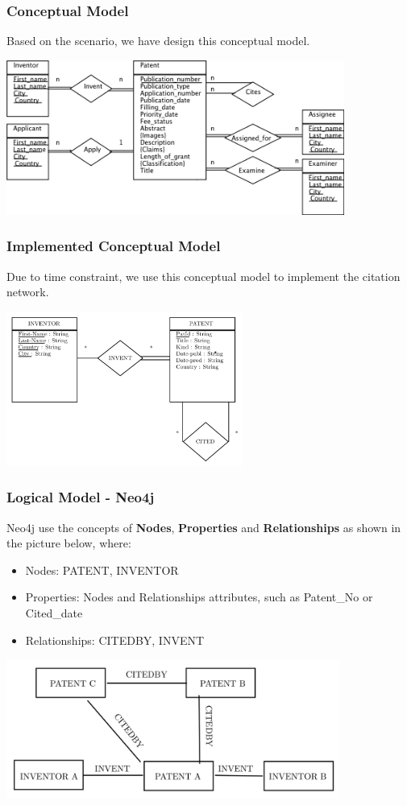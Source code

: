\documentclass{beamer}
\begin{document}
\begin{frame}
\frametitle{Conceptual Model}
Based on the scenario, we have design this conceptual model.
\begin{center}
\includegraphics[height=2in]{full_er.png}
\end{center}
\end{frame}

\begin{frame}
\frametitle{Implemented Conceptual Model}
Due to time constraint, we use this conceptual model to implement the citation network.
\begin{center}
\includegraphics[height=2in]{implemented_er.png}
\end{center}
\end{frame}

\begin{frame}
\frametitle{Logical Model - Neo4j}
Neo4j use the concepts of \textbf{Nodes}, \textbf{Properties} and \textbf{Relationships} as shown in the picture below, where:
\begin{itemize}
\item Nodes: PATENT, INVENTOR
\item Properties: Nodes and Relationships attributes, such as Patent\_No or Cited\_date
\item Relationships: CITEDBY, INVENT
\end{itemize}
\begin{center}
\includegraphics[height=1.8in]{neo4j.png}
\end{center}
\end{frame}
\end{document}
